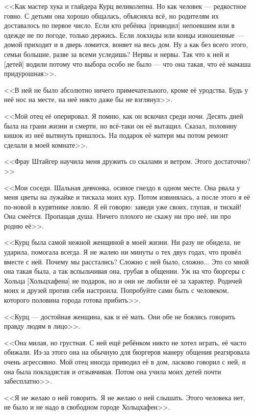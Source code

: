 <<Как мастер хука и глайдера Курц великолепна.
Но как человек --- редкостное говно.
С детьми она хорошо общалась, объясняла всё, но родителям их доставалось по первое число.
Если кто ребёнка [приводил] непоевшим или в одежде не по погоде, только держись.
Если локхиды или концы изношенные --- домой приходит и в дверь ломится, воняет на весь дом.
Ну а как без всего этого, семьи большие, разве за всеми уследишь?
Нервы и нервы.
Так что к ней и [детей] водили потому что выбора особо не было --- что она такая, что её мамаша придурошная>>.

<<В ней не было абсолютно ничего примечательного, кроме её уродства.
Будь у неё нос на месте, на неё никто даже бы не взглянул>>.

<<Мой отец её оперировал.
Я помню, как он вскочил среди ночи.
Десять дней была на грани жизни и смерти, но всё-таки он её вытащил.
Сказал, половину кишок из неё вытянуть пришлось.
На подарок её матери мы потом ремонт сделали в моей комнате>>.

<<Фрау Штайгер научила меня дружить со скалами и ветром.
Этого достаточно?>>

<<Мои соседи.
Шальная девчонка, осиное гнездо в одном месте.
Она рвала у меня цветы на лужайке и тискала моих кур.
Потом извинялась, а после этого я её по-новой в курятнике ловлю.
Я ей говорю: заведи уже своих, глупая, и тискай!
Она смеётся.
Пропащая душа.
Ничего плохого не скажу ни про неё, ни про родню её>>.

<<Курц была самой нежной женщиной в моей жизни.
Ни разу не обидела, не ударила, помогала всегда.
Я не жалею ни минуты о тех двух годах, что провёл вместе с ней.
Почему мы расстались?
Сложно с ней было, сложно...
Это со мной она такая была, а так вспыльчивая она, грубая в общении.
Уж на что бюргеры с Хольца [Хольцхафена] не подарок, но и они не любили её за характер.
Родичей моих и друзей против себя настроила.
Попробуйте сами быть с человеком, которого половина города готова прибить>>.

<<Курц --- достойная женщина, как и её мать.
Они обе не боялись говорить правду людям в лицо>>.

<<Она милая, но грустная.
С ней ещё ребёнком никто не хотел играть, её часто обижали.
Из-за этого она на обычную для бюргеров манеру общения реагировала очень агрессивно.
Мой отец иногда приводил её в дом, ласково говорил с ней, и она была покладистая и отзывчивая.
Потом она учила моих детей почти забесплатно>>.

<<Я не желаю о ней говорить.
Я не желаю о ней слышать.
Этого человека нет, не было и не надо в свободном городе Хольцхафен>>.

